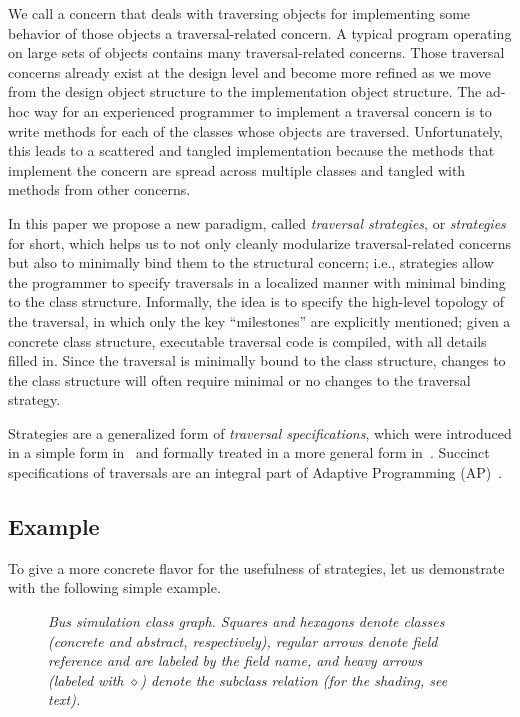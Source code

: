 We call a concern that deals with traversing objects for implementing
some behavior of those objects a traversal-related concern.  A typical
program operating on large sets of objects contains many
traversal-related concerns.  Those traversal concerns already exist at
the design level and become more refined as we move from the design
object structure to the implementation object structure.  The ad-hoc
way for an experienced programmer to implement a traversal concern is
to write methods for each of the classes whose objects are traversed.
Unfortunately, this leads to a scattered and tangled implementation
because the methods that implement the concern are spread across
multiple classes and tangled with methods from other concerns.

In this paper we propose a new paradigm, called {\em traversal
strategies}, or {\em strategies} for short, which helps us to not only
cleanly modularize traversal-related concerns but also to minimally
bind them to the structural concern; i.e., strategies allow the
programmer to specify traversals in a localized manner with minimal
binding to the class structure.  Informally, the idea is to specify
the high-level topology of the traversal, in which only the key
``milestones'' are explicitly mentioned; given a concrete class
structure, executable traversal code is compiled, with all details
filled in.  Since the traversal is minimally bound to the class
structure, changes to the class structure will often require minimal
or no changes to the traversal strategy.

Strategies are a generalized form of {\em traversal specifications},
which were introduced in a simple form in~\cite{karl:comp-enh} and
formally treated in a more general form
in~\cite{lieber-palsberg-xiao94}.  Succinct specifications of
traversals are an integral part of Adaptive Programming
(AP)~\cite{karl:demeter}.

\subsection{Example}

To give a more concrete flavor for the usefulness of strategies, let
us demonstrate with the following simple example.

\begin{figure}
\centerline{}
\caption{\em Bus simulation class graph.  Squares and hexagons denote
classes (concrete and abstract, respectively), regular arrows denote
field reference and are labeled by the field name, and heavy arrows
(labeled with $\diamond$) denote the subclass relation (for the
shading, see text).}
\label{fig-bus1}
\end{figure}

